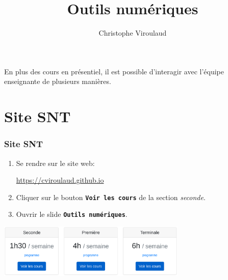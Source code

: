 \documentclass[svgnames,11pt]{beamer}
\author[]{Christophe Viroulaud}
\title{Outils numériques}
\date{\framebox{\textbf{Web 01}}}
\institute{Seconde - SNT}
\begin{document}
\begin{frame}
\titlepage
\end{frame}
\begin{frame}
    \frametitle{}

En plus des cours en présentiel, il est possible d'interagir avec l'équipe enseignante de plusieurs manières.

\vspace{2cm}

\end{frame}
\section{Site SNT}
\begin{frame}
    \frametitle{Site SNT}

\begin{activite}
\begin{enumerate}
    \item Se rendre sur le site web:
    \begin{center}
        {\Large \url{https://cviroulaud.github.io}}
    \end{center}
    \item Cliquer sur le bouton \textbf{\texttt{Voir les cours}} de la section \emph{seconde}.
    \item Ouvrir le slide \textbf{\texttt{Outils numériques}}.
\end{enumerate}
\end{activite}
\begin{center}
\centering
\includegraphics[width=9cm]{ressources/site.png}
\label{IMG}
\end{center}
\end{frame}
\end{document}

